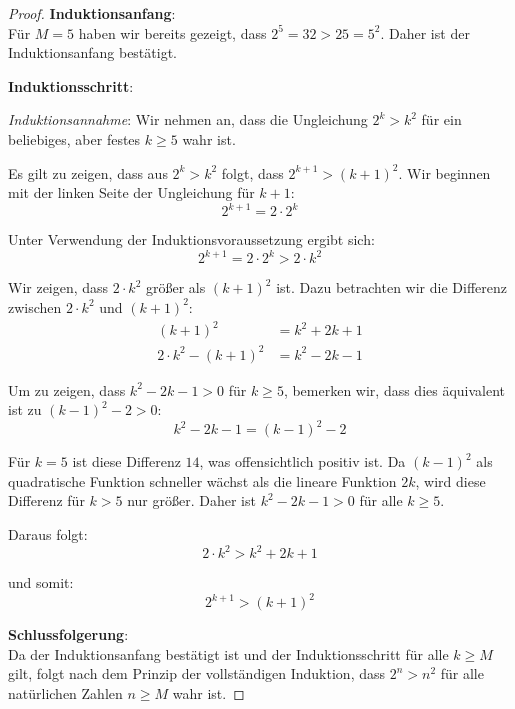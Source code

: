 \documentclass[12pt]{article}
\begin{document}
\begin{proof}
	\textbf{Induktionsanfang}: \\
	Für \( M = 5 \) haben wir bereits gezeigt, dass \( 2^5 = 32 > 25 = 5^2 \). Daher ist der Induktionsanfang bestätigt.

	\textbf{Induktionsschritt}:

	\textit{Induktionsannahme}: Wir nehmen an, dass die Ungleichung \( 2^k > k^2 \) für ein beliebiges, aber festes \( k \geq 5 \) wahr ist.

	Es gilt zu zeigen, dass aus \( 2^k > k^2 \) folgt, dass \( 2^{k+1} > (k+1)^2 \). Wir beginnen mit der linken Seite der Ungleichung für \( k+1 \):
	\[ 2^{k+1} = 2 \cdot 2^k \]

	Unter Verwendung der Induktionsvoraussetzung ergibt sich:
	\[ 2^{k+1} = 2 \cdot 2^k > 2 \cdot k^2 \]

	Wir zeigen, dass \( 2 \cdot k^2 \) größer als \( (k+1)^2 \) ist. Dazu betrachten wir die Differenz zwischen \( 2 \cdot k^2 \) und \( (k+1)^2 \):
	\begin{align*}
		(k+1)^2               & = k^2 + 2k + 1 \\
		2 \cdot k^2 - (k+1)^2 & = k^2 - 2k - 1
	\end{align*}

	Um zu zeigen, dass \( k^2 - 2k - 1 > 0 \) für \( k \geq 5 \), bemerken wir, dass dies äquivalent ist zu \( (k - 1)^2 - 2 > 0 \):
	\[ k^2 - 2k - 1 = (k - 1)^2 - 2 \]

	Für \( k = 5 \) ist diese Differenz \( 14 \), was offensichtlich positiv ist. Da \( (k - 1)^2 \) als quadratische Funktion schneller wächst als die lineare Funktion \( 2k \), wird diese Differenz für \( k > 5 \) nur größer. Daher ist \( k^2 - 2k - 1 > 0 \) für alle \( k \geq 5 \).

	Daraus folgt:
	\[ 2 \cdot k^2 > k^2 + 2k + 1 \]

	und somit:
	\[ 2^{k+1} > (k+1)^2 \]

	\textbf{Schlussfolgerung}: \\
	Da der Induktionsanfang bestätigt ist und der Induktionsschritt für alle \( k \geq M \) gilt, folgt nach dem Prinzip der vollständigen Induktion, dass \( 2^n > n^2 \) für alle natürlichen Zahlen \( n \geq M \) wahr ist.
\end{proof}
\end{document}
